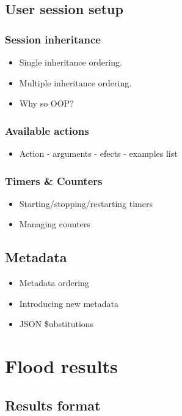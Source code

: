 \documentclass[a4paper]{article}
\begin{document}
\subsection{User session setup}
\label{sec-3-3}
\subsubsection{Session inheritance}
\label{sec-3-3-1}


\begin{itemize}
\item Single inheritance ordering.
\item Multiple inheritance ordering.
\item Why so OOP?
\end{itemize}
\subsubsection{Available actions}
\label{sec-3-3-2}


\begin{itemize}
\item Action - arguments - efects - examples list
\end{itemize}
\subsubsection{Timers \& Counters}
\label{sec-3-3-3}


\begin{itemize}
\item Starting/stopping/restarting timers
\item Managing counters
\end{itemize}
\subsection{Metadata}
\label{sec-3-4}


\begin{itemize}
\item Metadata ordering
\item Introducing new metadata
\item JSON \$ubstitutions
\end{itemize}

\pagebreak
\section{Flood results}
\label{sec-4}
\subsection{Results format}
\label{sec-4-1}
\end{document}
